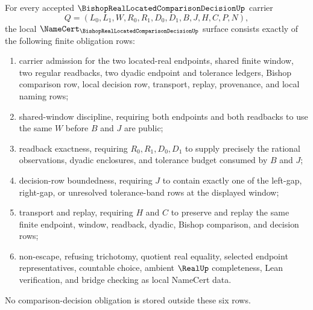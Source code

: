 \begin{theorem}
\label{thm:bishop-real-located-comparison-decision-namecert-obligations}
For every accepted $\BishopRealLocatedComparisonDecisionUp$ carrier
$$
Q=(L_0,L_1,W,R_0,R_1,D_0,D_1,B,J,H,C,P,N),
$$
the local $\NameCert_{\BishopRealLocatedComparisonDecisionUp}$ surface consists exactly of the following finite obligation rows:
\begin{enumerate}
\item carrier admission for the two located-real endpoints, shared finite window, two regular readbacks, two dyadic endpoint and tolerance ledgers, Bishop comparison row, local decision row, transport, replay, provenance, and local naming rows;
\item shared-window discipline, requiring both endpoints and both readbacks to use the same $W$ before $B$ and $J$ are public;
\item readback exactness, requiring $R_0,R_1,D_0,D_1$ to supply precisely the rational observations, dyadic enclosures, and tolerance budget consumed by $B$ and $J$;
\item decision-row boundedness, requiring $J$ to contain exactly one of the left-gap, right-gap, or unresolved tolerance-band rows at the displayed window;
\item transport and replay, requiring $H$ and $C$ to preserve and replay the same finite endpoint, window, readback, dyadic, Bishop comparison, and decision rows;
\item non-escape, refusing trichotomy, quotient real equality, selected endpoint representatives, countable choice, ambient $\RealUp$ completeness, Lean verification, and bridge checking as local NameCert data.
\end{enumerate}
No comparison-decision obligation is stored outside these six rows.
\end{theorem}
